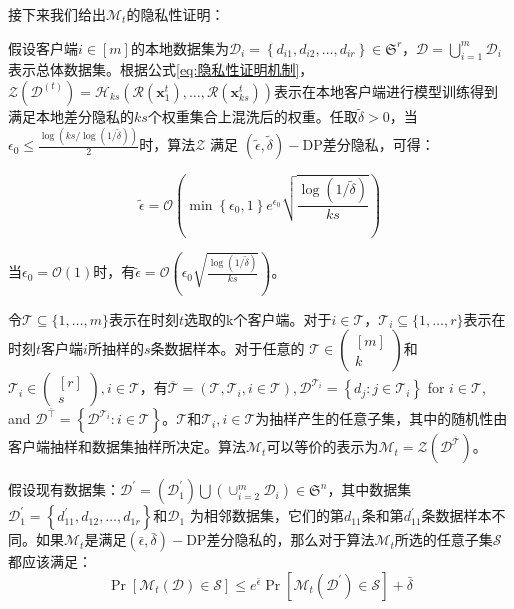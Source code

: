 接下来我们给出$\mathcal{M}_{t}$的隐私性证明：

假设客户端$i \in[m]$的本地数据集为$\mathcal{D}_{i}=\left\{d_{i 1}, d_{i 2}, \ldots, d_{i r}\right\} \in \mathfrak{S}^{r}$，$\mathcal{D}=\bigcup_{i=1}^{m} \mathcal{D}_{i}$表示总体数据集。根据公式\ref{eq:隐私性证明机制}，$\mathcal{Z}\left(\mathcal{D}^{(t)}\right)=\mathcal{H}_{k s}\left(\mathcal{R}\left(\boldsymbol{x}_{1}^{t}\right), \ldots, \mathcal{R}\left(\boldsymbol{x}_{k s}^{t}\right)\right)$表示在本地客户端进行模型训练得到满足本地差分隐私的$ks$个权重集合上混洗后的权重。任取$\tilde{\delta}>0$，当$\epsilon_{0} \leq \frac{\log (k s / \log (1 / \tilde{\delta}))}{2}$时，算法$\mathcal{Z}$ 满足 $(\tilde{\epsilon}, \tilde{\delta})-\mathrm{DP}$差分隐私，可得：

\begin{equation}\label{eq:隐私性证明机制2}
\tilde{\epsilon}=\mathcal{O}\left(\min \left\{\epsilon_{0}, 1\right\} e^{\epsilon_{0}} \sqrt{\frac{\log (1 / \tilde{\delta})}{k s}}\right)
\end{equation}

当$\epsilon_{0}=\mathcal{O}(1)$时，有$\tilde{\epsilon}=\mathcal{O}\left(\epsilon_{0} \sqrt{\frac{\log (1 / \tilde{\delta})}{k s}}\right)$。

令$\mathcal{T} \subseteq\{1, \ldots, m\}$表示在时刻$t$选取的k个客户端。对于$i \in \mathcal{T}$，$\mathcal{T}_{i} \subseteq\{1, \ldots, r\}$表示在时刻$t$客户端$i$所抽样的$s$条数据样本。对于任意的 $\mathcal{T} \in\left(\begin{array}{c}{[m]} \\ k\end{array}\right)$和$\mathcal{T}_{i} \in\left(\begin{array}{c}{[r]} \\ s\end{array}\right), i \in \mathcal{T}$，有$\overline{\mathcal{T}}=\left(\mathcal{T}, \mathcal{T}_{i}, i \in \mathcal{T}\right), \mathcal{D}^{\mathcal{T}_{i}}=\left\{d_{j}: j \in \mathcal{T}_{i}\right\}$ for $i \in \mathcal{T}$, and $\mathcal{D}^{\bar{\top}}=\left\{\mathcal{D}^{\mathcal{T}_{i}}: i \in \mathcal{T}\right\}$。$\mathcal{T}$和$\mathcal{T}_{i}, i \in \mathcal{T}$为抽样产生的任意子集，其中的随机性由客户端抽样和数据集抽样所决定。算法$\mathcal{M}_{t}$可以等价的表示为$\mathcal{M}_{t}=\mathcal{Z}\left(\mathcal{D}^{\overline{\mathcal{T}}}\right)$。

假设现有数据集：$\mathcal{D}^{\prime}=\left(\mathcal{D}_{1}^{\prime}\right) \bigcup\left(\cup_{i=2}^{m} \mathcal{D}_{i}\right) \in \mathfrak{S}^{n}$，其中数据集$\mathcal{D}_{1}^{\prime}=\left\{d_{11}^{\prime}, d_{12}, \ldots, d_{1 r}\right\}$和$\mathcal{D}_{1}$ 为相邻数据集，它们的第$d_{11}$条和第$d_{11}^{\prime}$条数据样本不同。如果$\mathcal{M}_{t}$是满足$(\bar{\epsilon}, \bar{\delta})-\mathrm{DP}$差分隐私的，那么对于算法$\mathcal{M}_{t}$所选的任意子集$\mathcal{S}$ 都应该满足：
\begin{equation}\label{eq:隐私性证明3}
\operatorname{Pr}\left[\mathcal{M}_{t}(\mathcal{D}) \in \mathcal{S}\right] \leq e^{\bar{\epsilon}} \operatorname{Pr}\left[\mathcal{M}_{t}\left(\mathcal{D}^{\prime}\right) \in \mathcal{S}\right]+\bar{\delta}
\end{equation}

